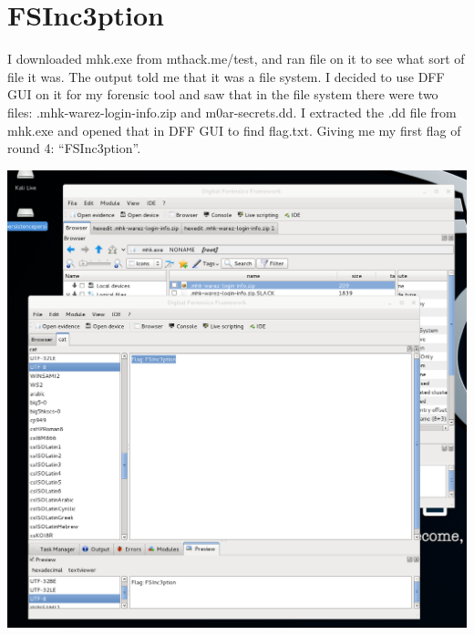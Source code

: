 \documentclass[12pt]{report}
\begin{document}
\section{FSInc3ption}
I downloaded mhk.exe from mthack.me/test, and ran file on it to see what sort of file it was. The output told me that it was a file system. I decided to use DFF GUI \cite{dff2012} on it for my forensic tool and saw that in the file system there were two files: .mhk-warez-login-info.zip and m0ar-secrets.dd. I extracted the .dd file from mhk.exe and opened that in DFF GUI to find flag.txt. Giving me my first flag of round 4: ``FSInc3ption''.\\
\newline
\begin{center}
\includegraphics[scale=0.33]{FSInc3ption.png}
\end{center}
\end{document}
